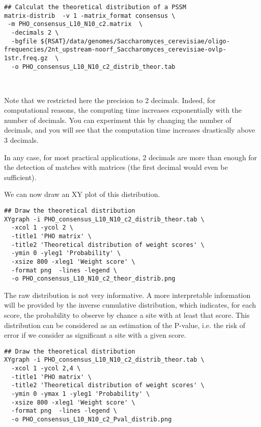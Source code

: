 {\color{Blue} \begin{footnotesize} 
\begin{verbatim}
## Calculat the theoretical distribution of a PSSM
matrix-distrib  -v 1 -matrix_format consensus \
 -m PHO_consensus_L10_N10_c2.matrix  \
  -decimals 2 \
  -bgfile ${RSAT}/data/genomes/Saccharomyces_cerevisiae/oligo-frequencies/2nt_upstream-noorf_Saccharomyces_cerevisiae-ovlp-1str.freq.gz  \
  -o PHO_consensus_L10_N10_c2_distrib_theor.tab
  
  
\end{verbatim} \end{footnotesize}
}

Note that we restricted here the precision to 2 decimals. Indeed, for
computational reasons, the computing time increases exponentially with
the number of decimals. You can experiment this by changing the number
of decimals, and you will see that the computation time increases
drastically above 3 decimals.  

In any case, for most practical applications, 2 decimals are more than
enough for the detection of matches with matrices (the first decimal
would even be sufficient).

We can now draw an XY plot of this distribution. 

{\color{Blue} \begin{footnotesize} 
\begin{verbatim}
## Draw the theoretical distribution
XYgraph -i PHO_consensus_L10_N10_c2_distrib_theor.tab \
  -xcol 1 -ycol 2 \
  -title1 'PHO matrix' \
  -title2 'Theoretical distribution of weight scores' \
  -ymin 0 -yleg1 'Probability' \
  -xsize 800 -xleg1 'Weight score' \
  -format png  -lines -legend \
  -o PHO_consensus_L10_N10_c2_theor_distrib.png
\end{verbatim} \end{footnotesize}
}


The raw distribution is not very informative. A more interpretable
information will be provided by the inverse cumulative distribution,
which indicates, for each score, the probability to observe by chance
a site with at least that score. This distribution can be considered
as an estimation of the P-value, i.e. the risk of error if we consider
as significant a site with a given score.

{\color{Blue} \begin{footnotesize} 
\begin{verbatim}
## Draw the theoretical distribution
XYgraph -i PHO_consensus_L10_N10_c2_distrib_theor.tab \
  -xcol 1 -ycol 2,4 \
  -title1 'PHO matrix' \
  -title2 'Theoretical distribution of weight scores' \
  -ymin 0 -ymax 1 -yleg1 'Probability' \
  -xsize 800 -xleg1 'Weight score' \
  -format png  -lines -legend \
  -o PHO_consensus_L10_N10_c2_Pval_distrib.png
\end{verbatim} \end{footnotesize}
}

